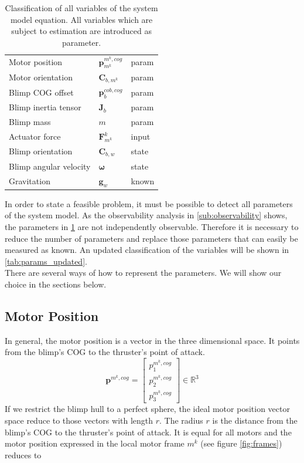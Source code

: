 \begin{table}[htb!]
\captionsetup{width=0.9\textwidth}
\centering
\caption{Classification of all variables of the system model equation. All variables which are subject to estimation are introduced as parameter.}
\begin{tabular}{lll}
\hline
Motor position & $\mathbf{p}^{m^k,cog}_{m^k}$ 	& param \\
Motor orientation & $\mathbf{C}_{b,m^k}$ 		& param \\
Blimp COG offset & $\mathbf{p}^{cob,cog}_b$ 	& param \\
Blimp inertia tensor & $\mathbf{J}_b$ 			& param \\
Blimp mass & $m$ 								& param \\
Actuator force & $\mathbf{F}_{m^k}^k$ 			& input \\
Blimp orientation & $\mathbf{C}_{b,w}$ 			& state \\
Blimp angular velocity & $\boldsymbol{\omega}$ 	& state \\
Gravitation & $\mathbf{g}_w$ 					& known \\
\hline
\end{tabular}
\label{tab:params}
\end{table}

In order to state a feasible problem, it must be possible to detect all parameters of the system model.
As the observability analysis in \cref{sub:observability} shows, the parameters in \cref{tab:params} are not independently observable.
Therefore it is necessary to reduce the number of parameters and replace those parameters that can easily be measured as known.
An updated classification of the variables will be shown in \cref{tab:params_updated}.
\\

There are several ways of how to represent the parameters.
We will show our choice in the sections below.

\subsection{Motor Position}
\label{sub:par_position}
In general, the motor position is a vector in the three dimensional space.
It points from the blimp's COG to the thruster's point of attack.
\begin{equation}
\mathbf{p}^{m^k,cog}
=
\left[ \begin{array}{c}
p^{m^k,cog}_1 \\
p^{m^k,cog}_2 \\
p^{m^k,cog}_3
\end{array} \right]
\in \mathbb{R}^3
\end{equation}
If we restrict the blimp hull to a perfect sphere, the ideal motor position vector space reduce to those vectors with length $r$.
The radius $r$ is the distance from the blimp's COG to the thruster's point of attack.
It is equal for all motors and the motor position expressed in the local motor frame $m^k$ (see figure \ref{fig:frames}) reduces to

